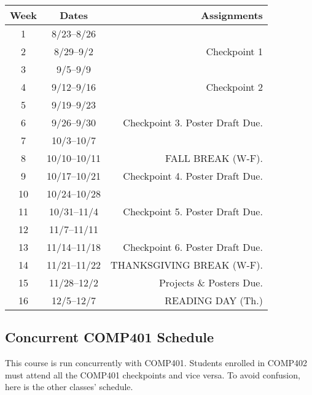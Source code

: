 \documentclass[10pt]{article}
\begin{document}
\begin{center}
\begin{tabular}{ccr}
\toprule
Week & Dates & Assignments \\
\toprule
1 & 8/23--8/26 &  \\
2 & 8/29--9/2 &   Checkpoint 1 \\
3 & 9/5--9/9 &    \\
4 & 9/12--9/16 & Checkpoint 2  \\
5 & 9/19--9/23 &   \\
6 & 9/26--9/30  &  Checkpoint 3. Poster Draft Due. \\
7 & 10/3--10/7 &  \\
8 & 10/10--10/11 & FALL BREAK (W-F). \\
9 & 10/17--10/21 & Checkpoint 4. Poster Draft Due. \\
10 & 10/24--10/28 &  \\
11 & 10/31--11/4 & Checkpoint 5. Poster Draft Due. \\
12 & 11/7--11/11 &  \\
13 & 11/14--11/18 & Checkpoint 6. Poster Draft Due. \\
14 & 11/21--11/22 &  THANKSGIVING BREAK (W-F).  \\
15 & 11/28--12/2 &  Projects \& Posters Due. \\
16 & 12/5--12/7 &  READING DAY (Th.) \\
\bottomrule
\end{tabular}
\end{center}

\subsection{Concurrent COMP401 Schedule}

This course is run concurrently with COMP401. Students enrolled in COMP402 must attend all the COMP401 checkpoints and vice versa. To avoid confusion, here is the other classes' schedule.
\end{document}
